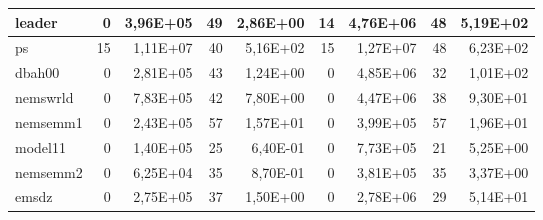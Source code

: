 \begin{tabular}{|l|r|r|r|r|r|r|r|r|}
leader & 0 & 3,96E+05 & 49 & 2,86E+00 & 14 & 4,76E+06 & 48 & 5,19E+02 \\ \hline
ps & 15 & 1,11E+07 & 40 & 5,16E+02 & 15 & 1,27E+07 & 48 & 6,23E+02 \\ \hline
dbah00 & 0 & 2,81E+05 & 43 & 1,24E+00 & 0 & 4,85E+06 & 32 & 1,01E+02 \\ \hline
nemswrld & 0 & 7,83E+05 & 42 & 7,80E+00 & 0 & 4,47E+06 & 38 & 9,30E+01 \\ \hline
nemsemm1 & 0 & 2,43E+05 & 57 & 1,57E+01 & 0 & 3,99E+05 & 57 & 1,96E+01 \\ \hline
model11 & 0 & 1,40E+05 & 25 & 6,40E-01 & 0 & 7,73E+05 & 21 & 5,25E+00 \\ \hline
nemsemm2 & 0 & 6,25E+04 & 35 & 8,70E-01 & 0 & 3,81E+05 & 35 & 3,37E+00 \\ \hline
emsdz & 0 & 2,75E+05 & 37 & 1,50E+00 & 0 & 2,78E+06 & 29 & 5,14E+01 \\ \hline
\end{tabular}
